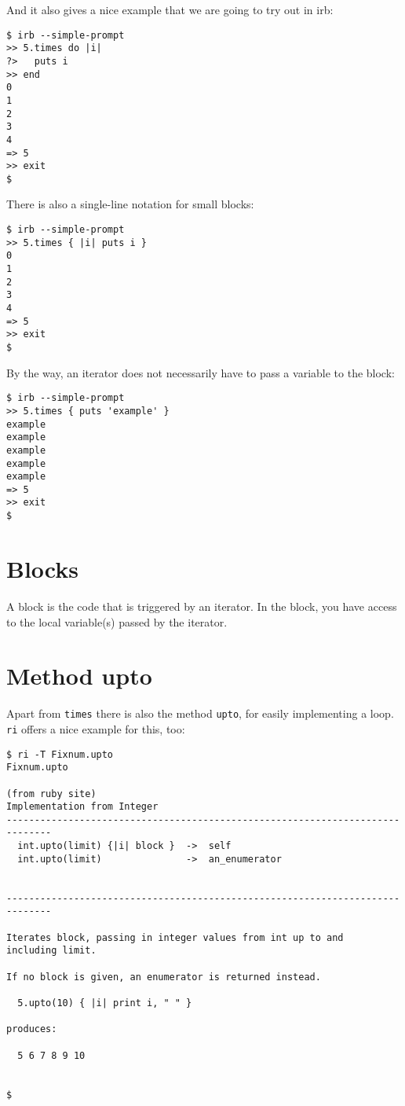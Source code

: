 \documentclass[a4paper]{book}
\begin{document}
And it also gives a nice example that we are going to try out in irb:

\begin{shaded}\begin{verbatim}
$ irb --simple-prompt
>> 5.times do |i|
?>   puts i
>> end
0
1
2
3
4
=> 5
>> exit
$
\end{verbatim}\end{shaded}

There is also a single-line notation for small blocks:

\begin{shaded}\begin{verbatim}
$ irb --simple-prompt
>> 5.times { |i| puts i }
0
1
2
3
4
=> 5
>> exit
$
\end{verbatim}\end{shaded}

By the way, an iterator does not necessarily have to pass a variable to the block:

\begin{shaded}\begin{verbatim}
$ irb --simple-prompt
>> 5.times { puts 'example' }
example
example
example
example
example
=> 5
>> exit
$
\end{verbatim}\end{shaded}

\section{Blocks}\label{blocks}

A block is the code that is triggered by an iterator. In the block, you have access to the local variable(s) passed by the iterator.

\section{Method upto}\label{method-upto}

Apart from \texttt{times} there is also the method \texttt{upto}, for easily implementing a loop. \texttt{ri} offers a nice example for this, too:

\begin{shaded}\begin{verbatim}
$ ri -T Fixnum.upto
Fixnum.upto

(from ruby site)
Implementation from Integer
------------------------------------------------------------------------------
  int.upto(limit) {|i| block }  ->  self
  int.upto(limit)               ->  an_enumerator


------------------------------------------------------------------------------

Iterates block, passing in integer values from int up to and
including limit.

If no block is given, an enumerator is returned instead.

  5.upto(10) { |i| print i, " " }

produces:

  5 6 7 8 9 10


$
\end{verbatim}\end{shaded}
\end{document}
